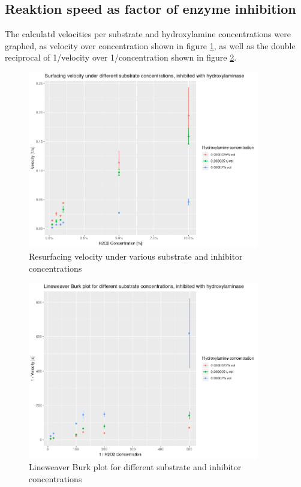 \documentclass[a4paper,english]{scrreprt}
\begin{document}
\subsection{Reaktion speed as factor of enzyme inhibition}

The calculatd velocities per substrate and hydroxylamine concentrations were
graphed, as velocity over concentration shown in figure \ref{fig:inhibition},
as well as the double reciprocal of 1/velocity over 1/concentration shown in
figure \ref{fig:inhibition_lburk}.

\begin{figure}
	\centering
	\includegraphics[width=0.9\textwidth]{img/inhibition.png}
	\caption{Resurfacing velocity under various substrate and inhibitor concentrations}
	\label{fig:inhibition}
\end{figure}

\begin{figure}
	\centering
	\includegraphics[width=0.9\textwidth]{img/inhibition_lburk.png}
	\caption{Lineweaver Burk plot for different substrate and inhibitor concentrations}
	\label{fig:inhibition_lburk}
\end{figure}
\end{document}
